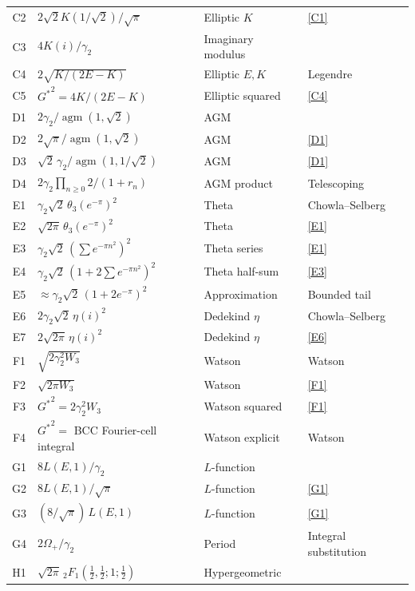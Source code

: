 \documentclass[12pt,reqno]{amsart}
\theoremstyle{definition}
\theoremstyle{remark}
\newcommand{\Gstar}{G^{\!*}}
\newcommand{\agm}{\operatorname{agm}}
\begin{document}
\begin{center}
\begin{longtable}{clll}
C2 & $2\sqrt2 K(1/\!\sqrt{2})/\sqrt{\pi}$ & Elliptic $K$ & \eqref{C1} \\
C3 & $4K(i)/\gamma_{2}$ & Imaginary modulus & \cite[19.7.2]{DLMF} \\
C4 & $2\sqrt{K/(2E-K)}$ & Elliptic $E,K$ & Legendre \\
C5 & ${\Gstar}^2=4K/(2E-K)$ & Elliptic squared & \eqref{C4} \\
\midrule
D1 & $2\gamma_{2}/\agm(1,\sqrt{2})$ & AGM & \cite[19.8.5]{DLMF} \\
D2 & $2\sqrt{\pi}/\agm(1,\sqrt{2})$ & AGM & \eqref{D1} \\
D3 & $\sqrt2\,\gamma_{2}/\agm(1,1/\!\sqrt{2})$ & AGM & \eqref{D1} \\
D4 & $2\gamma_2\prod_{n\geq0}2/(1+r_n)$ & AGM product & Telescoping \\
\midrule
E1 & $\gamma_{2}\sqrt{2}\,\theta_{3}(e^{-\pi})^{2}$ & Theta & Chowla--Selberg \\
E2 & $\sqrt{2\pi}\,\theta_{3}(e^{-\pi})^{2}$ & Theta & \eqref{E1} \\
E3 & $\gamma_2\sqrt{2}\,(\sum e^{-\pi n^2})^2$ & Theta series & \eqref{E1} \\
E4 & $\gamma_2\sqrt{2}\,(1+2\sum e^{-\pi n^2})^2$ & Theta half-sum & \eqref{E3} \\
E5 & $\approx\gamma_2\sqrt{2}\,(1+2e^{-\pi})^2$ & Approximation & Bounded tail \\
E6 & $2\gamma_2\sqrt{2}\,\eta(i)^2$ & Dedekind $\eta$ & Chowla--Selberg \\
E7 & $2\sqrt{2\pi}\,\eta(i)^2$ & Dedekind $\eta$ & \eqref{E6} \\
\midrule
F1 & $\sqrt{2\gamma_{2}^{2}W_{3}}$ & Watson & Watson~\cite{Watson} \\
F2 & $\sqrt{2\pi W_{3}}$ & Watson & \eqref{F1} \\
F3 & ${\Gstar}^{2}=2\gamma_{2}^{2}W_{3}$ & Watson squared & \eqref{F1} \\
F4 & ${\Gstar}^2=$ BCC Fourier-cell integral & Watson explicit & Watson~\cite{Watson} \\
\midrule
G1 & $8L(E,1)/\gamma_{2}$ & $L$-function & \cite[Lemma 3.1]{LiLongTu} \\
G2 & $8L(E,1)/\sqrt{\pi}$ & $L$-function & \eqref{G1} \\
G3 & $(8/\sqrt\pi)\,L(E,1)$ & $L$-function & \eqref{G1} \\
G4 & $2\Omega_{+}/\gamma_{2}$ & Period & Integral substitution \\
\midrule
H1 & $\sqrt{2\pi}\,{}_{2}F_{1}(\frac12,\frac12;1;\frac12)$ & Hypergeometric & \cite[19.5.1]{DLMF} \\

\end{longtable}
\end{center}
\end{document}
